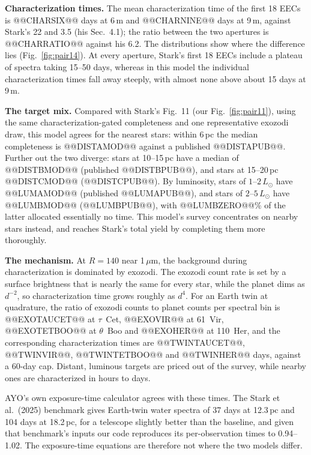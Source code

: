 \documentclass[11pt,a4paper]{article}
\begin{document}
\textbf{Characterization times.} The mean characterization time of the first 18 EECs is
@@CHARSIX@@ days at 6\,m and @@CHARNINE@@ days at 9\,m, against Stark's 22 and 3.5 (his
Sec.~4.1); the ratio between the two apertures is @@CHARRATIO@@ against his 6.2. The distributions
show where the difference lies (Fig.~\ref{fig:pair14}). At every aperture, Stark's first 18 EECs
include a plateau of spectra taking 15--50 days, whereas in this model the individual
characterization times fall away steeply, with almost none above about 15 days at 9\,m.

\textbf{The target mix.} Compared with Stark's Fig.~11 (our Fig.~\ref{fig:pair11}), using the same
characterization-gated completeness and one representative exozodi draw, this model agrees for the
nearest stars: within 6\,pc the median completeness is @@DISTAMOD@@ against a published
@@DISTAPUB@@. Further out the two diverge: stars at 10--15\,pc have a median of @@DISTBMOD@@
(published @@DISTBPUB@@), and stars at 15--20\,pc @@DISTCMOD@@ (@@DISTCPUB@@). By luminosity, stars
of $1$--$2\,L_\odot$ have @@LUMAMOD@@ (published @@LUMAPUB@@), and stars of $2$--$5\,L_\odot$ have
@@LUMBMOD@@ (@@LUMBPUB@@), with @@LUMBZERO@@\% of the latter allocated essentially no time. This
model's survey concentrates on nearby stars instead, and reaches Stark's total yield by completing
them more thoroughly.

\textbf{The mechanism.} At $R = 140$ near 1\,$\mu$m, the background during characterization is
dominated by exozodi. The exozodi count rate is set by a surface brightness that is nearly the same
for every star, while the planet dims as $d^{-2}$, so characterization time grows roughly as $d^4$.
For an Earth twin at quadrature, the ratio of exozodi counts to planet counts per spectral bin is
@@EXOTAUCET@@ at $\tau$~Cet, @@EXOVIR@@ at 61~Vir, @@EXOTETBOO@@ at $\theta$~Boo and @@EXOHER@@ at
110~Her, and the corresponding characterization times are @@TWINTAUCET@@, @@TWINVIR@@,
@@TWINTETBOO@@ and @@TWINHER@@ days, against a 60-day cap. Distant, luminous targets are priced out
of the survey, while nearby ones are characterized in hours to days.

AYO's own exposure-time calculator agrees with these times. The Stark et al.\ (2025) benchmark
gives Earth-twin water spectra of 37 days at 12.3\,pc and 104 days at 18.2\,pc, for a telescope
slightly better than the baseline, and given that benchmark's inputs our code reproduces its
per-observation times to 0.94--1.02. The exposure-time equations are therefore not where the two
models differ.
\end{document}

